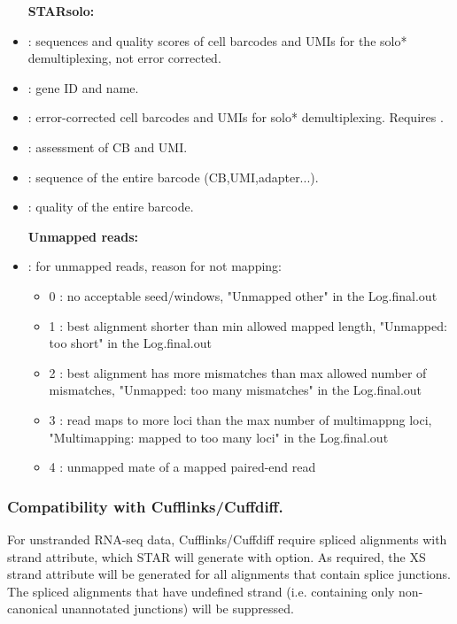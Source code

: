 \documentclass[12pt]{article}
\begin{document}
\begin{itemize}[itemsep=1pt]
\textbf{STARsolo:}
%
\item[]
 : sequences and quality scores of cell barcodes and UMIs for the solo* demultiplexing, not error corrected.
%
\item[]
 : gene ID and name.
%
\item[]
 : error-corrected cell barcodes and UMIs for solo* demultiplexing. Requires  .
%
\item[]
 : assessment of CB and UMI.
%
\item[]
 : sequence of the entire barcode (CB,UMI,adapter...).
%
\item[]
 : quality of the entire barcode.


\textbf{Unmapped reads:}
\item[]
 : for unmapped reads, reason for not mapping:
           \begin{itemize}[noitemsep,topsep=-3pt]
           	\item[] 0 : no acceptable seed/windows, "Unmapped other" in the Log.final.out
           	\item[] 1 : best alignment shorter than min allowed mapped length, "Unmapped: too short" in the Log.final.out
           	\item[] 2 : best alignment has more mismatches than max allowed number of mismatches, "Unmapped: too many mismatches" in the Log.final.out
			\item[] 3 : read maps to more loci than the max number of multimappng loci, "Multimapping: mapped to too many loci" in the Log.final.out
		    \item[] 4 : unmapped mate of a mapped paired-end read
           \end{itemize}

\end{itemize}

\subsubsection{Compatibility with Cufflinks/Cuffdiff.}
For unstranded RNA-seq data, Cufflinks/Cuffdiff require spliced alignments with  strand attribute, which STAR will generate with   option. As required, the XS strand attribute will be generated for all alignments that contain splice junctions. The spliced alignments that have undefined strand (i.e. containing only non-canonical unannotated junctions) will be suppressed.
\end{document}
